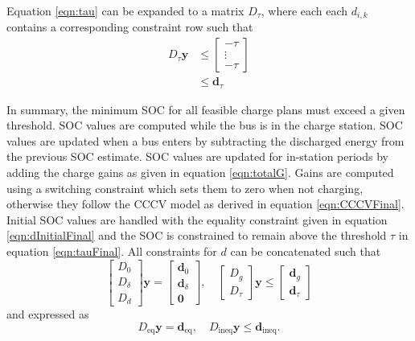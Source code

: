 Equation \ref{eqn:tau} can be expanded to a matrix $D_\tau$, where each each $d_{i,k}$ contains a corresponding constraint row such that
\begin{equation}\label{eqn:tauFinal}
	\begin{aligned}
		D_\tau\mathbf{y} & \le \begin{bmatrix}-\tau \\ \vdots \\ -\tau \end{bmatrix} \\
		       & \le \mathbf{d}_\tau
	\end{aligned}
\end{equation}
\par In summary, the minimum SOC for all feasible charge plans must exceed a given threshold.  SOC values are computed while the bus is in the charge station.  SOC values are updated when a bus enters by subtracting the discharged energy from the previous SOC estimate. SOC values are updated for in-station periods by adding the charge gains as given in equation \ref{eqn:totalG}.  Gains are computed using a switching constraint which sets them to zero when not charging, otherwise they follow the CCCV model as derived in equation \ref{eqn:CCCVFinal}. Initial SOC values are handled with the equality constraint given in equation \ref{eqn:dInitialFinal} and the SOC is constrained to remain above the threshold $\tau$ in equation \ref{eqn:tauFinal}. All constraints for $d$ can be concatenated such that 
\begin{equation}
	\begin{bmatrix}
	D_0 \\
	D_\delta \\
	D_d
	\end{bmatrix} \mathbf{y} = 
	\begin{bmatrix}
		\mathbf{d}_0 \\
		\mathbf{d}_\delta \\
		\mathbf{0}
		\end{bmatrix}, \quad \begin{bmatrix} D_g \\ D_\tau \end{bmatrix}\mathbf{y} \le \begin{bmatrix} \mathbf{d}_g \\ \mathbf{d}_\tau \end{bmatrix}
\end{equation}
and expressed as 
	\begin{equation}\label{eqn:cSocFinal}
	D_{\text{eq}}\mathbf{y} = \mathbf{d}_{\text{eq}}, \quad D_{\text{ineq}} \mathbf{y} \le \mathbf{d}_{\text{ineq}}.
\end{equation}
